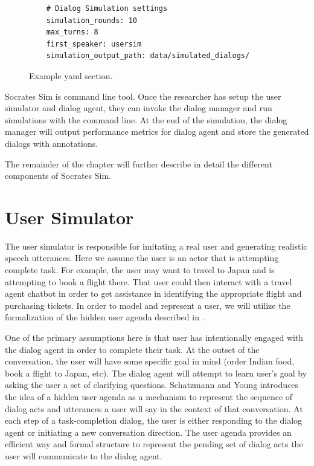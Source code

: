\begin{figure}[h!]
	\caption{Example yaml section. }
	\label{fig:ex_yaml}
	\begin{lstlisting}
	# Dialog Simulation settings
	simulation_rounds: 10
	max_turns: 8
	first_speaker: usersim
	simulation_output_path: data/simulated_dialogs/
	\end{lstlisting}
\end{figure}

Socrates Sim is command line tool. Once the researcher has setup the user simulator and dialog agent, they can invoke the dialog manager and run simulations with the command line. At the end of the simulation, the dialog manager will output performance metrics for dialog agent and store the generated dialogs with annotations.

The remainder of the chapter will further describe in detail the different components of Socrates Sim.

\section{User Simulator} 

The user simulator is responsible for imitating a real user and generating realistic speech utterances. Here we assume the user is an actor that is attempting complete task. For example, the user may want to travel to Japan and is attempting to book a flight there. That user could then interact with a travel agent chatbot in order to get assistance in identifying the appropriate flight and purchasing tickets. In order to model and represent a user, we will utilize the formalization of the hidden user agenda described in \cite{Schatzmann2009TheHA}.

 One of the primary assumptions here is that user has intentionally engaged with the dialog agent in order to complete their task. At the outset of the conversation, the user will have some specific goal in mind (order Indian food, book a flight to Japan, etc). The dialog agent will attempt to learn user's goal by asking the user a set of clarifying questions. Schatzmann and Young introduces the idea of a hidden user agenda as a mechanism to represent the sequence of dialog acts and utterances a user will say in the context of that conversation. At each step of a task-completion dialog, the user is either responding to the dialog agent or initiating a new conversation direction. The user agenda provides an efficient way and formal structure to represent the pending set of dialog acts the user will communicate to the dialog agent.
 
